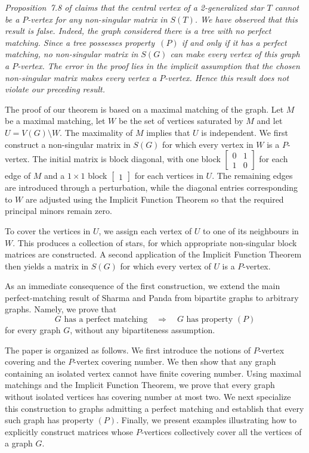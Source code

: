 \documentclass[12pt,reqno]{amsart}
\theoremstyle{plain}
\theoremstyle{definition}
\theoremstyle{block}
\theoremstyle{remark}
\numberwithin{equation}{section}
\begin{document}
\textit{Proposition~7.8 of \cite{fons1} claims that the central vertex of a 2-generalized star \(T\) cannot be a \(P\)-vertex for any non-singular matrix in \(S(T)\). We have observed that this result is false. Indeed, the graph considered
there is a tree with no perfect matching. Since a tree possesses
property~\((P)\) if and only if it has a perfect matching, no
non-singular matrix in \(S(G)\) can make every vertex of this graph a
\(P\)-vertex. The error in the proof lies in the implicit assumption
that the chosen non-singular matrix makes every vertex a \(P\)-vertex. Hence this result does not violate our preceding result.}


The proof of our theorem is based on a maximal matching of the graph. Let \(M\) be a maximal matching, let \(W\) be the set of vertices saturated by \(M\) and let \(U=V(G)\setminus W.\)
The maximality of \(M\) implies that \(U\) is independent. We first
construct a non-singular matrix in \(S(G)\) for which every vertex in
\(W\) is a \(P\)-vertex. The initial matrix is block diagonal, with one
block
\(
\begin{bmatrix}
0&1\\
1&0
\end{bmatrix}
\)
for each edge of \(M\) and a \(1\times1\) block \(\begin{bmatrix}
    1
\end{bmatrix}\) for each vertices in \(U\). The remaining edges are introduced through a
perturbation, while the diagonal entries corresponding to \(W\) are adjusted using the
Implicit Function Theorem so that the required principal minors remain
zero.

To cover the vertices in \(U\), we assign each vertex of \(U\) to one
of its neighbours in \(W\). This produces a collection of stars, for
which appropriate non-singular block matrices are constructed. A second
application of the Implicit Function Theorem then yields a matrix in
\(S(G)\) for which every vertex of \(U\) is a \(P\)-vertex.

As an immediate consequence of the first construction, we extend the
main perfect-matching result of Sharma and Panda from bipartite graphs
to arbitrary graphs. Namely, we prove that
\[
G\text{ has a perfect matching}
\quad\Longrightarrow\quad
G\text{ has property }(P)
\]
for every graph \(G\), without any bipartiteness assumption.

The paper is organized as follows. We first introduce the notions of \(P\)-vertex covering and the \(P\)-vertex covering number. We then show that any graph containing an isolated vertex cannot have finite covering number. Using maximal matchings and the Implicit Function Theorem, we prove that every graph without isolated vertices has covering number at most two. We next specialize this construction to graphs admitting a perfect matching and establish that every such graph has property $(P)$. Finally, we present examples illustrating how to explicitly construct matrices whose \(P\)-vertices collectively cover all the vertices of a graph $G$.
\end{document}
